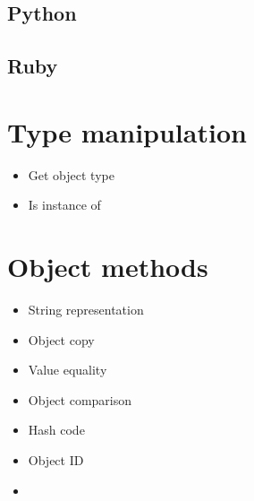 \documentclass{KodeBook}
\begin{document}


\subsection{Python}



\subsection{Ruby}




\section{Type manipulation}

\begin{itemize}
	\item Get object type
	\item Is instance of
\end{itemize}

\section{Object methods}

\begin{itemize}
	\item String representation
	\item Object copy
	\item Value equality
	\item Object comparison
	\item Hash code
	\item Object ID
	\item 
\end{itemize}







\ifx\wholebook\relax\else
% 
% 
	
\end{document}
